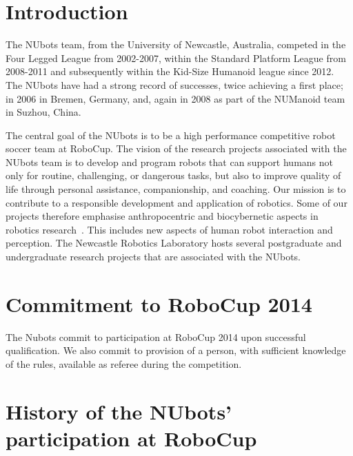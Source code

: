 \documentclass{llncs}
\begin{document}
%
\section{Introduction}
%
The NUbots team, from the University of Newcastle, Australia, competed in the Four Legged League from 2002-2007, within the Standard Platform League from 2008-2011 and subsequently within the Kid-Size Humanoid league since 2012. The NUbots have had a strong record of successes, twice achieving a first place; in 2006 in Bremen, Germany, and, again in 2008 as part of the NUManoid team in Suzhou, China.

The central goal of the NUbots is to be a high performance competitive robot soccer team at RoboCup. The vision of the research projects associated with the NUbots team is to develop and program robots that can support humans not only for routine, challenging, or dangerous tasks, but also to improve quality of life through personal assistance, companionship, and coaching.  Our mission is to contribute to a responsible development and application of robotics. Some of our projects therefore emphasise anthropocentric and biocybernetic
aspects in robotics research~\cite{ChalupOstwald2009}. This includes new aspects of human robot interaction and perception. The Newcastle Robotics Laboratory hosts several postgraduate and undergraduate research projects that are associated with the NUbots.


\section{Commitment to RoboCup 2014}
The Nubots commit to participation at RoboCup 2014 upon successful qualification. We also commit to provision of a person, with sufficient knowledge of the rules, available as referee during the competition.

\section{History of the NUbots' participation at RoboCup}
\end{document}
